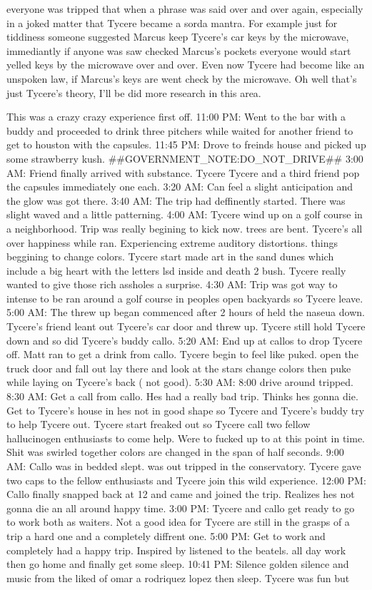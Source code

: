 \documentclass[12pt]{book}
\begin{document}
everyone was tripped that when a phrase was said over and over again, especially in a joked matter that Tycere became a sorda mantra. For example just for tiddiness someone suggested Marcus keep Tycere's car keys by the microwave, immediantly if anyone was saw checked Marcus's pockets everyone would start yelled keys by the microwave over and over. Even now Tycere had become like an unspoken law, if Marcus's keys are went check by the microwave. Oh well that's just Tycere's theory, I'll be did more research in this area.



This was a crazy crazy experience first off. 11:00 PM: Went to the bar with a buddy and proceeded to drink three pitchers while waited for another friend to get to houston with the capsules. 11:45 PM: Drove to freinds house and picked up some strawberry kush. \#\#GOVERNMENT\_NOTE:DO\_NOT\_DRIVE\#\# 3:00 AM: Friend finally arrived with substance. Tycere Tycere and a third friend pop the capsules immediately one each. 3:20 AM: Can feel a slight anticipation and the glow was got there. 3:40 AM: The trip had deffinently started. There was slight waved and a little patterning. 4:00 AM: Tycere wind up on a golf course in a neighborhood. Trip was really begining to kick now. trees are bent. Tycere's all over happiness while ran. Experiencing extreme auditory distortions. things beggining to change colors. Tycere start made art in the sand dunes which include a big heart with the letters lsd inside and death 2 bush. Tycere really wanted to give those rich assholes a surprise. 4:30 AM: Trip was got way to intense to be ran around a golf course in peoples open backyards so Tycere leave. 5:00 AM: The threw up began commenced after 2 hours of held the naseua down. Tycere's friend leant out Tycere's car door and threw up. Tycere still hold Tycere down and so did Tycere's buddy callo. 5:20 AM: End up at callos to drop Tycere off. Matt ran to get a drink from callo. Tycere begin to feel like puked. open the truck door and fall out lay there and look at the stars change colors then puke while laying on Tycere's back ( not good). 5:30 AM: 8:00 drive around tripped. 8:30 AM: Get a call from callo. Hes had a really bad trip. Thinks hes gonna die. Get to Tycere's house in hes not in good shape so Tycere and Tycere's buddy try to help Tycere out. Tycere start freaked out so Tycere call two fellow hallucinogen enthusiasts to come help. Were to fucked up to at this point in time. Shit was swirled together colors are changed in the span of half seconds. 9:00 AM: Callo was in bedded slept. was out tripped in the conservatory. Tycere gave two caps to the fellow enthusiasts and Tycere join this wild experience. 12:00 PM: Callo finally snapped back at 12 and came and joined the trip. Realizes hes not gonna die an all around happy time. 3:00 PM: Tycere and callo get ready to go to work both as waiters. Not a good idea for Tycere are still in the grasps of a trip a hard one and a completely diffrent one. 5:00 PM: Get to work and completely had a happy trip. Inspired by listened to the beatels. all day work then go home and finally get some sleep. 10:41 PM: Silence golden silence and music from the liked of omar a rodriquez lopez then sleep. Tycere was fun but 
\end{document}
